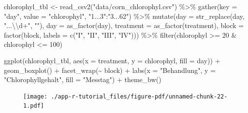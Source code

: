 \documentclass[
  letterpaper,
]{scrbook}
\newenvironment{Shaded}{\begin{snugshade}}{\end{snugshade}}
\newcommand{\AttributeTok}[1]{\textcolor[rgb]{0.40,0.45,0.13}{#1}}
\newcommand{\DecValTok}[1]{\textcolor[rgb]{0.68,0.00,0.00}{#1}}
\newcommand{\FunctionTok}[1]{\textcolor[rgb]{0.28,0.35,0.67}{#1}}
\newcommand{\NormalTok}[1]{\textcolor[rgb]{0.00,0.23,0.31}{#1}}
\newcommand{\OtherTok}[1]{\textcolor[rgb]{0.00,0.23,0.31}{#1}}
\newcommand{\SpecialCharTok}[1]{\textcolor[rgb]{0.37,0.37,0.37}{#1}}
\newcommand{\StringTok}[1]{\textcolor[rgb]{0.13,0.47,0.30}{#1}}
\begin{document}
\begin{Shaded}
\begin{Highlighting}[]
\NormalTok{chlorophyl\_tbl }\OtherTok{\textless{}{-}} \FunctionTok{read\_csv2}\NormalTok{(}\StringTok{"data/corn\_chlorophyl.csv"}\NormalTok{) }\SpecialCharTok{\%\textgreater{}\%} 
  \FunctionTok{gather}\NormalTok{(}\AttributeTok{key =} \StringTok{"day"}\NormalTok{, }\AttributeTok{value =} \StringTok{"chlorophyl"}\NormalTok{, }\StringTok{"1...3"}\SpecialCharTok{:}\StringTok{"3...62"}\NormalTok{) }\SpecialCharTok{\%\textgreater{}\%} 
  \FunctionTok{mutate}\NormalTok{(}\AttributeTok{day =} \FunctionTok{str\_replace}\NormalTok{(day, }\StringTok{"...}\SpecialCharTok{\textbackslash{}\textbackslash{}}\StringTok{d+"}\NormalTok{, }\StringTok{""}\NormalTok{),}
         \AttributeTok{day =} \FunctionTok{as\_factor}\NormalTok{(day),}
         \AttributeTok{treatment =} \FunctionTok{as\_factor}\NormalTok{(treatment),}
         \AttributeTok{block =} \FunctionTok{factor}\NormalTok{(block, }\AttributeTok{labels =} \FunctionTok{c}\NormalTok{(}\StringTok{"I"}\NormalTok{, }\StringTok{"II"}\NormalTok{, }\StringTok{"III"}\NormalTok{, }\StringTok{"IV"}\NormalTok{))) }\SpecialCharTok{\%\textgreater{}\%} 
  \FunctionTok{filter}\NormalTok{(chlorophyl }\SpecialCharTok{\textgreater{}=} \DecValTok{20} \SpecialCharTok{\&}\NormalTok{ chlorophyl }\SpecialCharTok{\textless{}=} \DecValTok{100}\NormalTok{)}
\end{Highlighting}
\end{Shaded}

\begin{Shaded}
\begin{Highlighting}[]
\FunctionTok{ggplot}\NormalTok{(chlorophyl\_tbl, }\FunctionTok{aes}\NormalTok{(}\AttributeTok{x =}\NormalTok{ treatment, }\AttributeTok{y =}\NormalTok{ chlorophyl, }\AttributeTok{fill =}\NormalTok{ day)) }\SpecialCharTok{+}
  \FunctionTok{geom\_boxplot}\NormalTok{() }\SpecialCharTok{+}
  \FunctionTok{facet\_wrap}\NormalTok{(}\SpecialCharTok{\textasciitilde{}}\NormalTok{ block) }\SpecialCharTok{+}
  \FunctionTok{labs}\NormalTok{(}\AttributeTok{x =} \StringTok{"Behandlung"}\NormalTok{, }\AttributeTok{y =} \StringTok{"Chlorophyllgehalt"}\NormalTok{, }\AttributeTok{fill =} \StringTok{"Messtag"}\NormalTok{) }\SpecialCharTok{+}
  \FunctionTok{theme\_bw}\NormalTok{()}
\end{Highlighting}
\end{Shaded}

\begin{figure}[H]

{\centering \texttt{[image: ./app-r-tutorial\_files/figure-pdf/unnamed-chunk-22-1.pdf]}

}

\end{figure}
\end{document}
